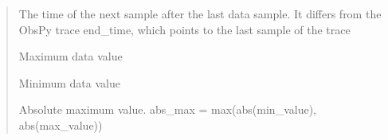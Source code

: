 \documentclass[letterpaper,10pt,english]{sphinxmanual}
\begin{document}
\begin{fulllineitems}
\begin{quote}
\begin{description}
\sphinxAtStartPar
The time of the next sample after the last data sample.
It differs from the ObsPy trace end\_time, which points to the last sample of the trace

\sphinxAtStartPar
Maximum data value

\sphinxAtStartPar
Minimum data value

\sphinxAtStartPar
Absolute maximum value.
abs\_max = max(abs(min\_value), abs(max\_value))

\end{description}\end{quote}

\end{fulllineitems}

\end{document}
